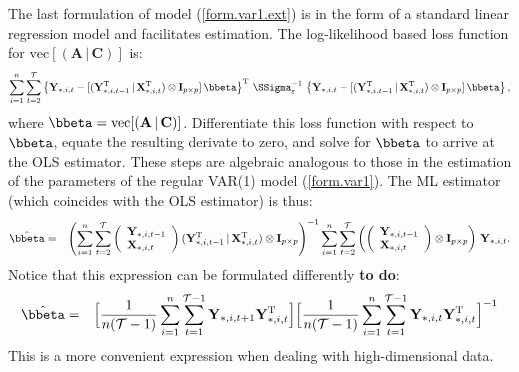 \documentclass[a4paper]{article}
\theoremstyle{myexamplestyle}
\def\reminder#1{\marginpar{\rule[0pt]{1mm}{11pt}}\textbf{#1}}
\begin{document}
The last formulation of model (\ref{form.var1.ext}) is in the form of a standard linear regression model and facilitates  estimation. The log-likelihood based loss function for $\mbox{vec}[( \mathbf{A} \, | \, \mathbf{C} )]$ is:
\begin{eqnarray*}
\sum_{i=1}^n \sum_{t=2}^{\mathcal{T}} \left\{
\mathbf{Y}_{\ast,i,t} - [ (\mathbf{Y}_{\ast,i,t-1}^{\mathrm{T}} \, |  \, \mathbf{X}_{\ast,i,t}^{\mathrm{T}}) \otimes \mathbf{I}_{p \times p} ]  \, \bbeta   \right\}^{\mathrm{T}} \, \SSigma_{\varepsilon}^{-1} \, \left\{ \mathbf{Y}_{\ast,i,t} - [ (\mathbf{Y}_{\ast,i,t-1}^{\mathrm{T}} \, |  \, \mathbf{X}_{\ast,i,t}^{\mathrm{T}}) \otimes \mathbf{I}_{p \times p} ]  \, \bbeta   \right\},
\end{eqnarray*}
where $\bbeta = \mbox{vec}[( \mathbf{A} \, | \, \mathbf{C} )]$.  Differentiate this loss function with respect to $\bbeta$, equate the resulting derivate to zero, and solve for $\bbeta$ to arrive at the OLS estimator. These steps are algebraic analogous to those in the estimation of the parameters of the regular VAR(1) model (\ref{form.var1}). The ML estimator (which coincides with the OLS estimator) is thus:
\begin{eqnarray*}
\hat{\bbeta} & = &
\left(
\sum_{i=1}^n \sum_{t=2}^{\mathcal{T}} \left(
\begin{array}{l}
\mathbf{Y}_{\ast,i,t-1}
\\
\mathbf{X}_{\ast,i,t}
\end{array} \right)
(\mathbf{Y}_{\ast,i,t-1}^{\mathrm{T}} \, |  \, \mathbf{X}_{\ast,i,t}^{\mathrm{T}}) \otimes \mathbf{I}_{p \times p}
\right)^{-1}
\sum_{i=1}^n \sum_{t=2}^{\mathcal{T}} \left( \left(
\begin{array}{l}
\mathbf{Y}_{\ast,i,t-1}
\\
\mathbf{X}_{\ast,i,t}
\end{array} \right)  \otimes \mathbf{I}_{p \times p} \right)
\, \mathbf{Y}_{\ast,i,t}.
\end{eqnarray*}
Notice that this expression can be formulated differently \reminder{to do}:
\begin{eqnarray*}
\hat{\bbeta} & = &  \Big[ \frac{1}{n(\mathcal{T}-1)} \sum_{i=1}^n \sum_{t=1}^{\mathcal{T}-1}  \mathbf{Y}_{\ast,i,t+1} \mathbf{Y}_{\ast,i,t}^{\mathrm{T}} \Big] \Big[ \frac{1}{n({\mathcal{T}}-1)} \sum_{i=1}^n \sum_{t=1}^{{\mathcal{T}}-1}  \mathbf{Y}_{\ast,i,t} \mathbf{Y}_{\ast,i,t}^{\mathrm{T}} \Big]^{-1}
\end{eqnarray*}
This is a more convenient expression when dealing with high-dimensional data.
\end{document}
